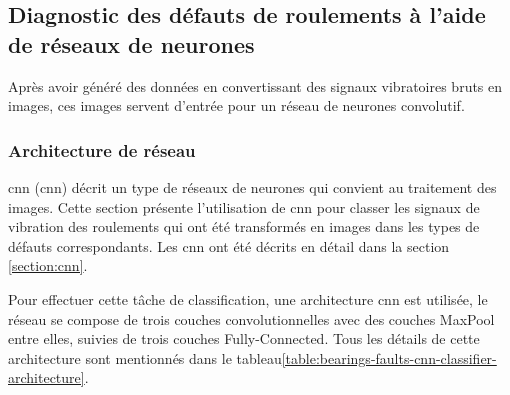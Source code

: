\subsection{Diagnostic des défauts de roulements à l'aide de réseaux de neurones}
Après avoir généré des données en convertissant des signaux vibratoires bruts en images, ces images servent d'entrée pour un réseau de neurones convolutif.

\subsubsection{Architecture de réseau}
\acrlong{cnn} (\acrshort{cnn}) décrit un type de réseaux de neurones qui convient au traitement des images. Cette section présente l'utilisation de \acrshort{cnn} pour classer les signaux de vibration des roulements qui ont été transformés en images dans les types de défauts correspondants. Les \acrshort{cnn} ont été décrits en détail dans la section \ref{section:cnn}.

Pour effectuer cette tâche de classification, une architecture \acrshort{cnn} est utilisée, le réseau se compose de trois couches convolutionnelles avec des couches MaxPool entre elles, suivies de trois couches Fully-Connected. Tous les détails de cette architecture sont mentionnés dans le tableau\ref{table:bearings-faults-cnn-classifier-architecture}.

